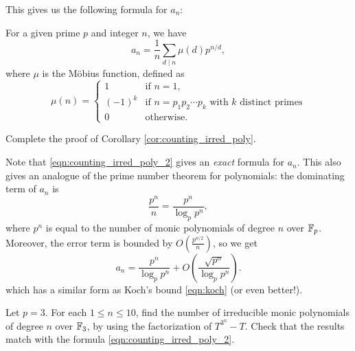 This gives us the following formula for $a_n$:
\begin{corollary}
    \label{cor:counting_irred_poly}
    For a given prime $p$ and integer $n$, we have
    \begin{equation}
        a_n = \frac{1}{n} \sum_{d \mid n} \mu(d) p^{n/d},
        \label{eqn:counting_irred_poly_2}
    \end{equation}
    where $\mu$ is the M\"obius function, defined as
    \begin{equation}
        \mu(n) = \begin{cases}
            1 & \text{if } n = 1,\\
            (-1)^k & \text{if } n = p_1 p_2 \cdots p_k \text{ with } k \text{ distinct primes} \\
            0 & \text{otherwise.}
        \end{cases}
    \label{eqn:mobius}
    \end{equation}
\end{corollary}

\begin{exercise}
    Complete the proof of Corollary \ref{cor:counting_irred_poly}.
\end{exercise}

Note that \eqref{eqn:counting_irred_poly_2} gives an \emph{exact} formula for $a_n$.
This also gives an analogue of the prime number theorem for polynomials: the dominating term of $a_n$ is
\[
\frac{p^n}{n} = \frac{p^n}{\log_p p^n},
\]
where $p^n$ is equal to the number of monic polynomials of degree $n$ over $\mathbb{F}_p$.
Moreover, the error term is bounded by $O\left(\frac{p^{n/2}}{n}\right)$, so we get
\begin{equation}
    a_n = \frac{p^n}{\log_p p^n} + O\left(\frac{\sqrt{p^n}}{\log_p p^n}\right).
    \label{eqn:pi-f}
\end{equation}
which has a similar form as Koch's bound \eqref{eqn:koch} (or even better!).

\begin{exercise}\sage
    Let $p = 3$. For each $1 \le n \le 10$, find the number of irreducible monic polynomials of degree $n$ over $\mathbb{F}_3$, by using the factorization of $T^{3^n} - T$.
    Check that the results match with the formula \eqref{eqn:counting_irred_poly_2}.
\end{exercise}

